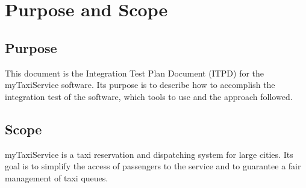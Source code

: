 \section{Purpose and Scope}
\label{sec:purpose}

\subsection{Purpose}
This document is the Integration Test Plan Document (ITPD) for the myTaxiService software.
Its purpose is to describe how to accomplish the integration test of the software, which tools to use and the approach followed.

\subsection{Scope}
myTaxiService is a taxi reservation and dispatching system for large cities. Its goal is to simplify the access of passengers to the service and to guarantee a fair management of taxi queues.
